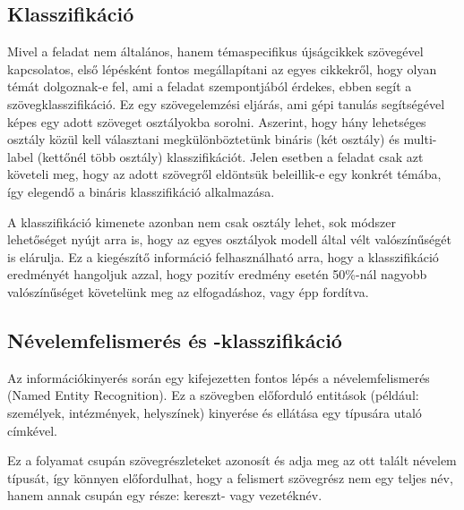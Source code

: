 \subsection{Klasszifikáció}


Mivel a feladat nem általános, hanem témaspecifikus újságcikkek szövegével kapcsolatos, első lépésként fontos megállapítani az egyes cikkekről, hogy olyan témát dolgoznak-e fel, ami a feladat szempontjából érdekes, ebben segít a szövegklasszifikáció. Ez egy szövegelemzési eljárás, ami gépi tanulás segítségével képes egy adott szöveget osztályokba sorolni. Aszerint, hogy hány lehetséges osztály közül kell választani megkülönböztetünk bináris (két osztály) és multi-label (kettőnél több osztály) klasszifikációt. Jelen esetben a feladat csak azt követeli meg, hogy az adott szövegről eldöntsük beleillik-e egy konkrét témába, így elegendő a bináris klasszifikáció alkalmazása.

A klasszifikáció kimenete azonban nem csak osztály lehet, sok módszer lehetőséget nyújt arra is, hogy az egyes osztályok modell által vélt valószínűségét is elárulja. Ez a kiegészítő információ felhasználható arra, hogy a klasszifikáció eredményét hangoljuk azzal, hogy pozitív eredmény esetén 50\%-nál nagyobb valószínűséget követelünk meg az elfogadáshoz, vagy épp fordítva.

\subsection{Névelemfelismerés és -klasszifikáció}

Az információkinyerés során egy kifejezetten fontos lépés a névelemfelismerés (Named Entity Recognition). Ez a szövegben előforduló entitások (például: személyek, intézmények, helyszínek) kinyerése és ellátása egy típusára utaló címkével.

Ez a folyamat csupán szövegrészleteket azonosít és adja meg az ott talált névelem típusát, így könnyen előfordulhat, hogy a felismert szövegrész nem egy teljes név, hanem annak csupán egy része: kereszt- vagy vezetéknév.

